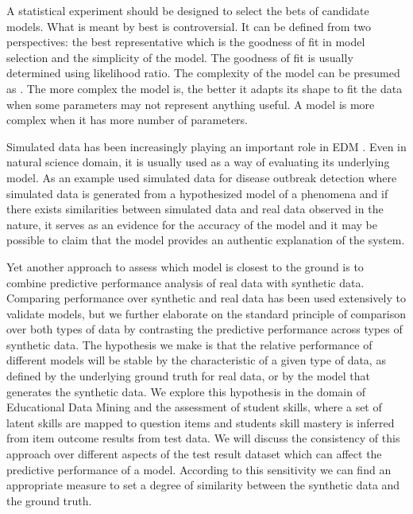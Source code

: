 A statistical experiment should be designed to select the bets of candidate models. What is meant by best is controversial. It can be defined from two perspectives: the best representative which is the goodness of fit in model selection and the simplicity of the model. The goodness of fit is usually determined using likelihood ratio. The complexity of the model can be presumed as \DIFdelbegin {}\DIFdelend \DIFaddbegin {}\DIFaddend . The more complex the model is, the better it adapts its shape to fit the data when some parameters may not represent anything useful. A model is more complex when it has more number of parameters. \DIFdelbegin %
\DIFdelend \DIFaddbegin {}\DIFaddend 


Simulated data has been increasingly playing an important role in EDM \citep{JEDM:baker2009}. Even in natural science domain, it is usually used as a way of evaluating its underlying model. As an example \citep{jafarpour2015quantifying} used simulated data for disease outbreak detection where simulated data is generated from a hypothesized model of a phenomena and if there exists similarities between simulated data and real data observed in the nature, it serves as an evidence for the accuracy of the model and it may be possible to claim that the model provides an authentic explanation of the system. 
\DIFdelbegin %
\DIFdelend 

Yet another approach to assess which model is closest to the ground \DIFdelbegin {}\DIFdelend \DIFaddbegin {}\DIFaddend is to combine predictive performance analysis of real data with synthetic data.  Comparing performance over synthetic and real data has been used extensively to validate models, but we further elaborate on the standard principle of comparison over both types of data by contrasting the predictive performance across types of synthetic data.  The hypothesis we make is that the relative performance of different models will be stable by the characteristic of a given type of data, as defined by the underlying ground truth for real data, or by the model that generates the synthetic data.  We explore this hypothesis in the domain of Educational Data Mining and the assessment of student skills, where a set of latent skills are mapped to question items and students skill mastery is inferred from item outcome results from test data. We will discuss the consistency of this approach over different aspects of the test result dataset which can affect the predictive performance of a model. According to this sensitivity we can find an appropriate measure to set a degree of similarity between the synthetic data and the ground truth.

